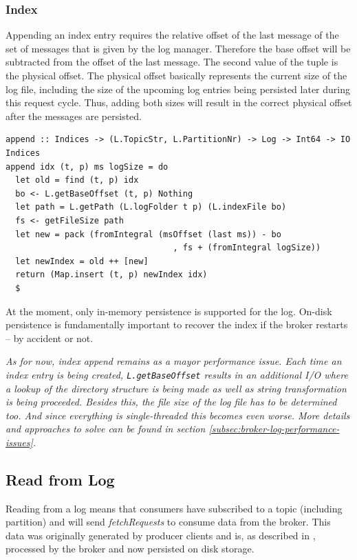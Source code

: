 \subsubsection{Index}

Appending an index entry requires the relative offset of the last message
of the set of messages that is given by the log manager. Therefore the base
offset will be subtracted from the offset of the last message. The second value
of the tuple is the physical offset. The physical offset basically represents
the current size of the log file, including the size of the upcoming log
entries being persisted later during this request cycle. Thus, adding both sizes
will result in the correct physical offset after the messages are persisted.

\begin{lstlisting}[caption={Appending entry to index}]
append :: Indices -> (L.TopicStr, L.PartitionNr) -> Log -> Int64 -> IO Indices
append idx (t, p) ms logSize = do
  let old = find (t, p) idx
  bo <- L.getBaseOffset (t, p) Nothing 
  let path = L.getPath (L.logFolder t p) (L.indexFile bo)
  fs <- getFileSize path
  let new = pack (fromIntegral (msOffset (last ms)) - bo
                                  , fs + (fromIntegral logSize)) 
  let newIndex = old ++ [new]
  return (Map.insert (t, p) newIndex idx)
  $
\end{lstlisting}

At the moment, only in-memory persistence is supported for the log. On-disk
persistence is fundamentally important to recover the index if the broker
restarts -- by accident or not.

\textit{As for now, index append remains as a mayor performance issue. Each
  time an index entry is being created, \lstinline{L.getBaseOffset} results in
  an additional I/O where a lookup of the directory structure is being made as
  well as string transformation is being proceeded. Besides this, the file size
of the log file has to be determined too. And since everything is
single-threaded this becomes even worse. More details and approaches to solve
can be found in section \ref{subsec:broker-log-performance-issues}.}


\subsection{Read from Log}
\label{subsec:broker-log-read}

Reading from a log means that consumers have subscribed to a topic (including
partition) and will send \textit{fetchRequests} to consume data from the broker.
This data was originally generated by producer clients and is, as described in
\label{subsec:broker-log-append}, processed by the broker and now persisted on
disk storage. 

